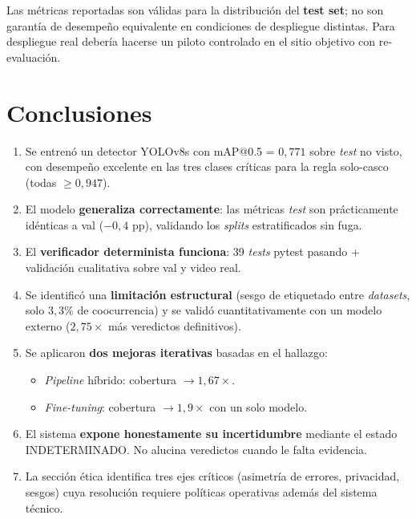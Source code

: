 \documentclass[journal,onecolumn,11pt]{IEEEtran}
\begin{document}
Las métricas reportadas son válidas para la distribución del
\textbf{test set}; no son garantía de desempeño equivalente en
condiciones de despliegue distintas. Para despliegue real debería
hacerse un piloto controlado en el sitio objetivo con re-evaluación.

\section{Conclusiones}

\begin{enumerate}[leftmargin=*]
    \item Se entrenó un detector YOLOv8s con mAP@0.5 = $0{,}771$
    sobre \textit{test} no visto, con desempeño excelente en las
    tres clases críticas para la regla solo-casco (todas
    $\geq 0{,}947$).

    \item El modelo \textbf{generaliza correctamente}: las métricas
    \textit{test} son prácticamente idénticas a val ($-0{,}4$ pp),
    validando los \textit{splits} estratificados sin fuga.

    \item El \textbf{verificador determinista funciona}: 39
    \textit{tests} pytest pasando + validación cualitativa sobre val
    y video real.

    \item Se identificó una \textbf{limitación estructural} (sesgo
    de etiquetado entre \textit{datasets}, solo $3{,}3\%$ de
    coocurrencia) y se validó cuantitativamente con un modelo
    externo ($2{,}75 \times$ más veredictos definitivos).

    \item Se aplicaron \textbf{dos mejoras iterativas} basadas en
    el hallazgo:
    \begin{itemize}
        \item \textit{Pipeline} híbrido: cobertura
        $\to 1{,}67 \times$.
        \item \textit{Fine-tuning}: cobertura $\to 1{,}9 \times$ con
        un solo modelo.
    \end{itemize}

    \item El sistema \textbf{expone honestamente su incertidumbre}
    mediante el estado INDETERMINADO. No alucina veredictos cuando
    le falta evidencia.

    \item La sección ética identifica tres ejes críticos (asimetría
    de errores, privacidad, sesgos) cuya resolución requiere
    políticas operativas además del sistema técnico.
\end{enumerate}
\end{document}
